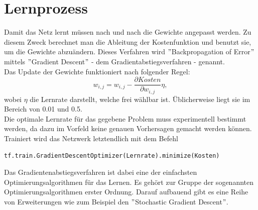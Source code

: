 \section{Lernprozess}
Damit das Netz lernt m\"ussen nach und nach die Gewichte angepasst werden. Zu diesem Zweck berechnet man die Ableitung der Kostenfunktion und benutzt sie, um die Gewichte abzu\"andern. Dieses Verfahren wird $"$Backpropagation of Error$"$ mittels $"$Gradient Descent$"$ - dem Gradientabstiegsverfahren - genannt.\\
Das Update der Gewichte funktioniert nach folgender Regel:\cite{Rojas1996}
\begin{equation}
w_{i,j}=w_{i,j}-\frac{\partial Kosten }{\partial w_{i,j}}\eta,
\end{equation}
wobei $\eta$ die Lernrate darstellt, welche frei w\"ahlbar ist. \"Ublicherweise liegt sie im Bereich von 0.01 und 0.5.\\
Die optimale Lernrate f\"ur das gegebene Problem muss experimentell bestimmt werden, da dazu im Vorfeld keine genauen Vorhersagen gemacht werden können.
Trainiert wird das Netzwerk letztendlich mit dem Befehl \cite{building}
\begin{lstlisting}
tf.train.GradientDescentOptimizer(Lernrate).minimize(Kosten)
\end{lstlisting}
Das Gradientenabstiegsverfahren ist dabei eine der einfachsten Optimierungsalgorithmen für das Lernen. Es gehört zur Gruppe der sogenannten Optimierungsalgorithmen erster Ordnung.\cite{Goodfellow} Darauf aufbauend gibt es eine Reihe von Erweiterungen wie zum Beispiel den $"$Stochastic Gradient Descent$"$.\cite{Goodfellow}